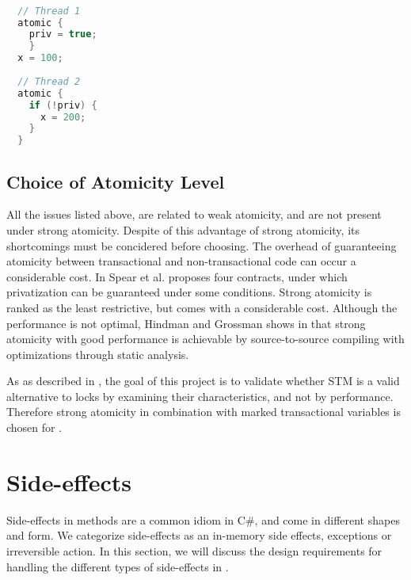 \begin{lstlisting}[label=lst:privatization,
  caption={Privatization issue},
  language=Java,  
  showspaces=false,
  showtabs=false,
  breaklines=true,
  showstringspaces=false,
  breakatwhitespace=true,
  commentstyle=\color{greencomments},
  keywordstyle=\color{bluekeywords},
  stringstyle=\color{redstrings},
  morekeywords={atomic, retry, orElse, var, get, set}]  % Start your code-block

  // Thread 1
  atomic {
    priv = true;
    }
  x = 100;
  
  // Thread 2
  atomic {
    if (!priv) {
      x = 200;
    }
  }
\end{lstlisting}

\subsection{Choice of Atomicity Level}
All the issues listed above, are related to weak atomicity, and are not present under strong atomicity. Despite of this advantage of strong atomicity, its shortcomings must be concidered before choosing. The overhead of guaranteeing atomicity between transactional and non-transactional code can occur a considerable cost\cite{spear2007privatization}. In \cite{spear2007privatization} Spear et al. proposes four contracts, under which privatization can be guaranteed under some conditions. Strong atomicity is ranked as the least restrictive, but comes with a considerable cost. Although the performance is not optimal, Hindman and Grossman shows in \cite{hindman2006atomicity} that strong atomicity with good performance is achievable by source-to-source compiling with optimizations through static analysis.

As as described in , the goal of this project is to validate whether \ac{STM} is a valid alternative to locks by examining their characteristics, and not by performance. Therefore strong atomicity in combination with marked transactional variables is chosen for \stmname. 

\section{Side-effects}\label{sec:side-effects}
Side-effects in methods are a common idiom in C\#, and come in different shapes and form. We categorize side-effects as an in-memory side effects, exceptions or irreversible action. In this section, we will discuss the design requirements for handling the different types of side-effects in \stmname.

